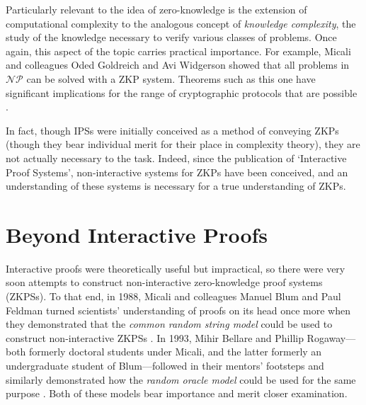 \documentclass{article}
\begin{document}
\begin{adjustwidth}{0.5in}{0in}
Particularly relevant to the idea of zero-knowledge is the extension of computational complexity to the analogous concept of \textit{knowledge complexity}, the study of the knowledge necessary to verify various classes of problems. Once again, this aspect of the topic carries practical importance. For example, Micali and colleagues Oded Goldreich and Avi Widgerson showed that all problems in $\mathcal{NP}$ can be solved with a ZKP system. Theorems such as this one have significant implications for the range of cryptographic protocols that are possible \cite{GMR}.
\end{adjustwidth} \vspace{0.15in}

In fact, though IPSs were initially conceived as a method of conveying ZKPs (though they bear individual merit for their place in complexity theory), they are not actually necessary to the task. Indeed, since the publication of `Interactive Proof Systems', non-interactive systems for ZKPs have been conceived, and an understanding of these systems is necessary for a true understanding of ZKPs.


\section{Beyond Interactive Proofs}

Interactive proofs were theoretically useful but impractical, so there were very soon attempts to construct non-interactive zero-knowledge proof systems (ZKPSs). To that end, in 1988, Micali and colleagues Manuel Blum and Paul Feldman turned scientists' understanding of proofs on its head once more when they demonstrated that the \textit{common random string model} could be used to construct non-interactive ZKPSs \cite{BFM}. In 1993, Mihir Bellare and Phillip Rogaway---both formerly doctoral students under Micali, and the latter formerly an undergraduate student of Blum---followed in their mentors' footsteps and similarly demonstrated how the \textit{random oracle model} could be used for the same purpose \cite{BR}. Both of these models bear importance and merit closer examination.
\end{document}
